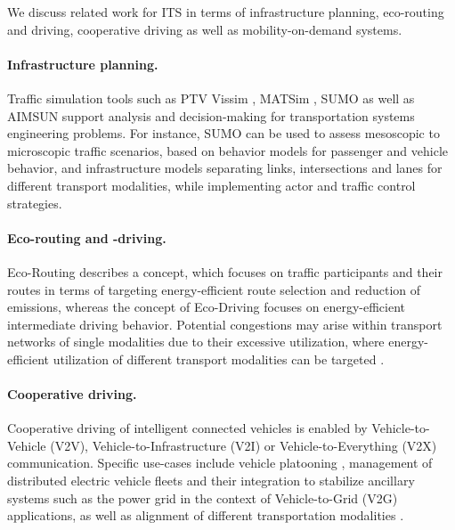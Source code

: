 \documentclass[a4paper,twoside]{article}
\begin{document}
	We discuss related work for ITS in terms of infrastructure planning, eco-routing and driving, cooperative driving as well as mobility-on-demand systems.

	\paragraph{Infrastructure planning.}
	\label{sec:infrastructure-planning}
	
	Traffic simulation tools such as PTV Vissim \cite{fellendorf_vissim_1994}, MATSim \cite{w_axhausen_multi-agent_2016}, SUMO \cite{lopez_microscopic_2018} as well as AIMSUN \cite{barcelo2005dynamic} support analysis and decision-making for transportation systems engineering problems.
	For instance, SUMO can be used to assess mesoscopic to microscopic traffic scenarios, based on behavior models for passenger and vehicle behavior, and infrastructure models separating links, intersections and lanes for different transport modalities, while implementing actor and traffic control strategies.

	\paragraph{Eco-routing and -driving.}
	\label{sec:eco-routing}

	Eco-Routing \cite{ericsson2006optimizing} describes a concept, which focuses on traffic participants and their routes in terms of targeting energy-efficient route selection and reduction of emissions, whereas the concept of Eco-Driving \cite{huang2018eco} focuses on energy-efficient intermediate driving behavior.
	Potential congestions may arise within transport networks of single modalities due to their excessive utilization, where energy-efficient utilization of different transport modalities can be targeted \cite{namoun2021eco}.

	\paragraph{Cooperative driving.}
	\label{sec:cooperative-driving}

	Cooperative driving of intelligent connected vehicles \cite{wang2022review}	is enabled by Vehicle-to-Vehicle (V2V), Vehicle-to-Infrastructure (V2I) or Vehicle-to-Everything (V2X) communication.
	Specific use-cases include vehicle platooning \cite{jia2015survey}, management of distributed electric vehicle fleets and their integration to stabilize ancillary systems such as the power grid in the context of Vehicle-to-Grid (V2G) \cite{hu2016electric} applications, as well as alignment of different transportation modalities \cite{harris2015ict}.
	
\end{document}
